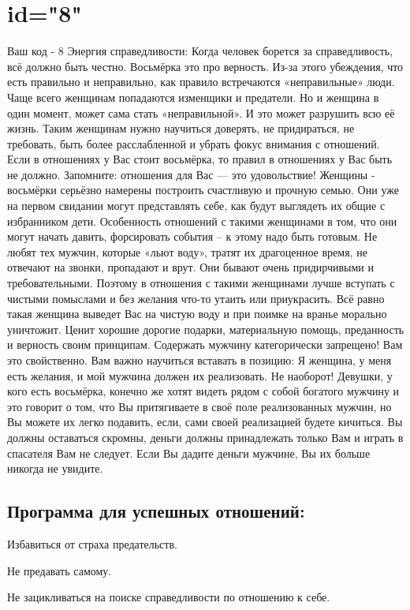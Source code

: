 \section{id="8"}{Ваш код - 8}
Энергия справедливости: Когда человек борется за справедливость, всё 
должно быть честно. Восьмёрка это про верность. Из-за этого убеждения, 
что есть правильно и неправильно, как правило встречаются «неправильные» 
люди. Чаще всего женщинам попадаются изменщики и предатели. Но и 
женщина в один момент, может сама стать «неправильной». И это может 
разрушить всю её жизнь. Таким женщинам нужно научиться доверять, не 
придираться, не требовать, быть более расслабленной и убрать фокус 
внимания с отношений. Если в отношениях у Вас стоит восьмёрка, то 
правил в отношениях у Вас быть не должно. Запомните: отношения для 
Вас — это удовольствие! Женщины - восьмёрки серьёзно намерены построить 
счастливую и прочную семью. Они уже на первом свидании могут представлять 
себе, как будут выглядеть их общие с избранником дети. Особенность 
отношений с такими женщинами в том, что они могут начать давить, 
форсировать события – к этому надо быть готовым. Не любят тех мужчин, 
которые «льют воду», тратят их драгоценное время, не отвечают на 
звонки, пропадают и врут. Они бывают очень придирчивыми и 
требовательными. Поэтому в отношения с такими женщинами лучше вступать 
с чистыми помыслами и без желания что-то утаить или приукрасить. 
Всё равно такая женщина выведет Вас на чистую воду и при поимке на 
вранье морально уничтожит. Ценит хорошие дорогие подарки, материальную 
помощь, преданность и верность своим принципам. Содержать мужчину 
категорически запрещено! Вам это свойственно. Вам важно научиться 
вставать в позицию: Я женщина, у меня есть желания, и мой мужчина 
должен их реализовать. Не наоборот! Девушки, у кого есть восьмёрка, 
конечно же хотят видеть рядом с собой богатого мужчину и это говорит 
о том, что Вы притягиваете в своё поле реализованных мужчин, но Вы 
можете их легко подавить, если, сами своей реализацией будете кичиться. 
Вы должны оставаться скромны, деньги должны принадлежать только Вам 
и играть в спасателя Вам не следует. Если Вы дадите деньги мужчине, 
Вы их больше никогда не увидите.
\subsection{Программа для успешных отношений:}
\item Избавиться от страха предательств.
\item Не предавать самому.
\item Не зацикливаться на поиске справедливости по отношению к себе.
\endsubsection
\endsection

